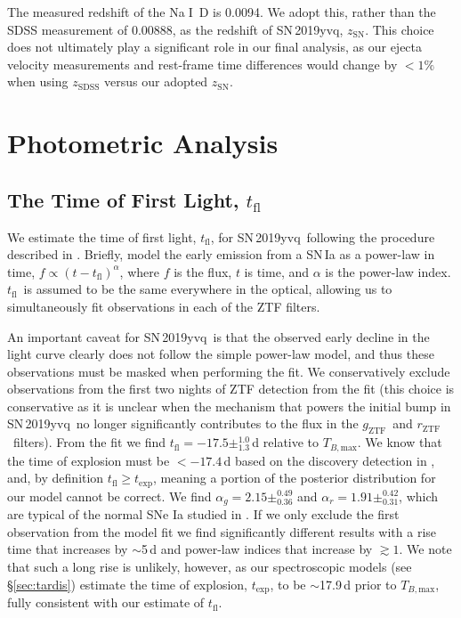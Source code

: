 \documentclass[twocolumn]{aastex63}
\def\ion#1#2{#1$\;${\footnotesize\rm{#2}}\relax}
\newcommand{\rztf}{$r_\mathrm{ZTF}$}
\newcommand{\gztf}{$g_\mathrm{ZTF}$}
\newcommand{\tfl}{$t_\mathrm{fl}$}
\newcommand{\tbmax}{$T_{B,\mathrm{max}}$}
\newcommand{\sn}{SN\,2019yvq}
\begin{document}
The measured redshift of the \ion{Na}{I}~D is 0.0094. We adopt this, rather
than the SDSS measurement of 0.00888, as the redshift of \sn, $z_\mathrm{SN}$.
This choice does not ultimately play a significant role in our final analysis,
as our ejecta velocity measurements and rest-frame time differences would
change by $<1\%$ when using $z_\mathrm{SDSS}$ versus our adopted
$z_\mathrm{SN}$.


\section{Photometric Analysis}\label{sec:phot}

\subsection{The Time of First Light, \tfl}\label{sec:t_fl}

We estimate the time of first light, \tfl, for \sn\ following the procedure
described in \citet{Miller20}. Briefly, \citet{Miller20} model the early
emission from a SN\,Ia as a power-law in time, $f \propto (t -
t_\mathrm{fl})^\alpha$, where $f$ is the flux, $t$ is time, and $\alpha$ is
the power-law index. \tfl\ is assumed to be the same everywhere in the
optical, allowing us to simultaneously fit observations in each of the ZTF
filters.

An important caveat for \sn\ is that the observed early decline in the light
curve clearly does not follow the simple power-law model, and thus these
observations must be masked when performing the fit. We conservatively exclude
observations from the first two nights of ZTF detection from the fit (this
choice is conservative as it is unclear when the mechanism that powers the
initial bump in \sn\ no longer significantly contributes to the flux in the
\gztf\ and \rztf\ filters). From the fit we find \tfl$ = -17.5
\pm^{1.0}_{1.3}$\,d relative to \tbmax. We know that the time of explosion
must be $< -17.4$\,d based on the discovery detection in \citealt{Itagaki19},
and, by definition $t_\mathrm{fl} \ge t_\mathrm{exp}$, meaning a portion of
the posterior distribution for our model cannot be correct. We find $\alpha_g
= 2.15 \pm^{0.49}_{0.36}$ and $\alpha_r = 1.91 \pm^{0.42}_{0.31}$, which are
typical of the normal SNe Ia studied in \citet{Miller20}. If we only exclude
the first observation from the model fit we find significantly different
results with a rise time that increases by $\sim$5\,d and power-law indices
that increase by $\gtrsim 1$. We note that such a long rise is unlikely,
however, as our spectroscopic models (see \S\ref{sec:tardis}) estimate the
time of explosion, $t_\mathrm{exp}$, to be $\sim$17.9\,d prior to \tbmax,
fully consistent with our estimate of \tfl.
\end{document}
